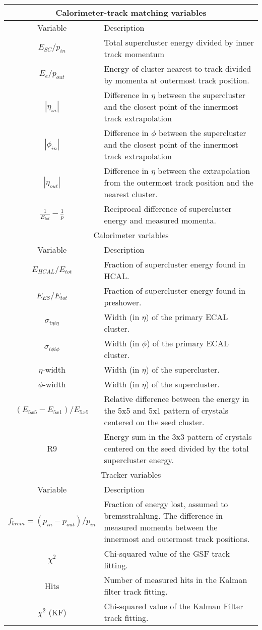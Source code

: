 \begin{sidewaystable}[h]
\centering
\begin{tabular}{|c|p{15cm}|}
    \hline
    \multicolumn{2}{|c|}{Calorimeter-track matching variables} \\
    \hline
    Variable & Description \\
    \hline
    $E_{SC} / p_{in}$ & Total supercluster energy divided by inner track
    momentum \\
    $E_{e}/ p_{out}$ & Energy of cluster nearest to track divided by momenta at
    outermost track position.\\
    $|\eta_{in}|$ & Difference in $\eta$ between the supercluster and the
    closest point of the innermost track extrapolation \\
    $|\phi_{in}|$ & Difference in $\phi$ between the supercluster and the
    closest point of the innermost track extrapolation \\
    $|\eta_{out}|$ & Difference in $\eta$ between the extrapolation from
    the outermost track position and the nearest cluster.\\
    $\frac{1}{E_{tot}} - \frac{1}{p}$ & Reciprocal difference of supercluster
    energy and measured momenta.\\
\hline
\hline
\multicolumn{2}{|c|}{Calorimeter variables} \\
    \hline
    Variable & Description \\
    \hline
    $E_{HCAL}/E_{tot} $ & Fraction of supercluster energy found in HCAL.\\
    $E_{ES}/E_{tot} $ & Fraction of supercluster energy found in preshower.\\
    $\sigma_{i\eta i\eta}$ & Width (in $\eta$) of the primary ECAL cluster.\\
    $\sigma_{i\phi i\phi}$ & Width (in $\phi$) of the primary ECAL cluster.\\
    $\eta$-width & Width (in $\eta$) of the supercluster.\\
    $\phi$-width & Width (in $\eta$) of the supercluster.\\
    $(E_{5x5}-E_{5x1})/E_{5x5}$ & Relative difference between the energy in the
    5x5 and 5x1 pattern of crystals centered on the seed cluster.\\
    R9 & Energy sum in the 3x3 pattern of crystals centered on the seed
    divided by the total supercluster energy.\\
\hline
\hline
\multicolumn{2}{|c|}{Tracker variables} \\
    \hline
    Variable & Description \\
    \hline
    $f_{brem} = (p_{in} - p_{out})/p_{in} $ & Fraction of energy lost, assumed to bremsstrahlung. The
    difference in measured momenta between the innermost and outermost track
    positions.\\
    $\chi^2$ & Chi-squared value of the GSF track fitting.\\
    Hits & Number of measured hits in the Kalman filter track fitting.\\
$\chi^2$ (KF) & Chi-squared value of the Kalman Filter track fitting. \\
\hline


\end{tabular}
\end{sidewaystable}
